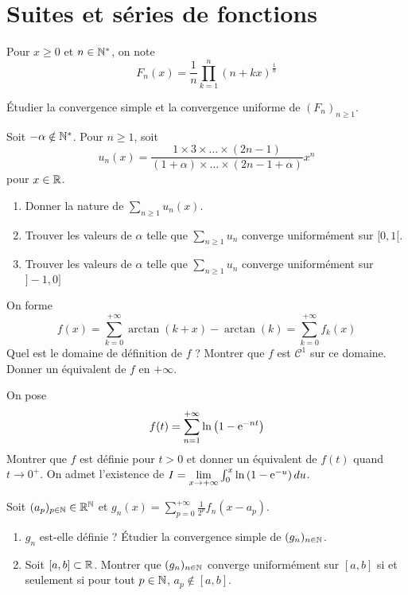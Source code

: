 \section{Suites et séries de fonctions}

\begin{exercise}
    Pour $x\geqslant0$ et $n\in\mathbb{N}^{*}$, on note 
    $$F_{n}(x)=\frac{1}{n}\prod_{k=1}^{n}\left(n+kx\right)^{\frac{1}{n}}$$

    Étudier la convergence simple et la convergence uniforme de $(F_{n})_{n\geqslant1}$.
\end{exercise}

\begin{exercise}
    Soit $-\alpha\notin\mathbb{N}^{*}$. Pour $n\geqslant1$, soit 
    $$u_{n}(x)=\frac{1\times 3\times\dots\times(2n-1)}{(1+\alpha)\times\dots\times(2n-1+\alpha)}x^{n}$$
    pour $x\in\mathbb{R}$.

    \begin{enumerate}
        \item Donner la nature de $\sum_{n\geqslant1}u_{n}(x)$.
        \item Trouver les valeurs de $\alpha$ telle que $\sum_{n\geqslant1}u_{n}$ converge uniformément sur $[0,1[$.
        \item Trouver les valeurs de $\alpha$ telle que $\sum_{n\geqslant1}u_{n}$ converge uniformément sur $]-1,0]$
    \end{enumerate}
\end{exercise}

\begin{exercise}
    On forme 
    $$f(x)=\sum_{k=0}^{+\infty}\arctan(k+x)-\arctan(k)=\sum_{k=0}^{+\infty}f_{k}(x)$$
    Quel est le domaine de définition de $f$ ? Montrer que $f$ est $\mathcal{C}^{1}$ sur ce domaine. Donner un équivalent de $f$ en $+\infty$.
\end{exercise}

\begin{exercise}
    On pose 
    $$f(t)=\sum_{n=1}^{+\infty}\ln\left(1-\mathrm{e}^{-nt}\right)$$
    Montrer que $f$ est définie pour $t>0$ et donner un équivalent de $f(t)$ quand $t\to0^{+}$. On admet l'existence de $I=\lim\limits_{x\to+\infty}\int_{0}^{x}\ln\left(1-\mathrm{e}^{-u}\right)du$.
\end{exercise}

\begin{exercise}
    Soit 
    $(a_{p})_{p\in\mathbb{N}}\in\mathbb{R}^{\mathbb{N}}$ et $g_{n}(x)=\sum_{p=0}^{+\infty}\frac{1}{2^{p}}f_{n}(x-a_{p})$.
    \begin{enumerate}
        \item $g_{n}$ est-elle définie ? Étudier la convergence simple de $(g_{n})_{n\in\mathbb{N}}$.
        \item Soit $[a,b]\subset\mathbb{R}$. Montrer que $(g_{n})_{n\in\mathbb{N}}$ converge uniformément sur $[a,b]$ si et seulement si pour tout $p\in\mathbb{N}$, $a_{p}\notin[a,b]$.
    \end{enumerate}
\end{exercise}

